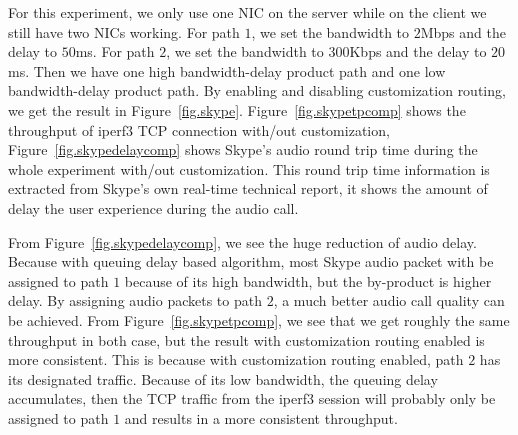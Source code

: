 For this experiment, we only use one NIC on the server while on the client we still have two NICs working. For path $1$, we set the bandwidth to $2$Mbps and the delay to $50$ms. For path $2$, we set the bandwidth to $300$Kbps and the delay to $20$ms. Then we have one high bandwidth-delay product path and one low bandwidth-delay product path. By enabling and disabling customization routing, we get the result in Figure~\ref{fig.skype}. Figure~\ref{fig.skypetpcomp} shows the throughput of iperf3 TCP connection with/out customization, Figure~\ref{fig.skypedelaycomp} shows Skype's audio round trip time during the whole experiment with/out customization. This round trip time information is extracted from Skype's own real-time technical report, it shows the amount of delay the user experience during the audio call. 

From Figure~\ref{fig.skypedelaycomp}, we see the huge reduction of audio delay. Because with queuing delay based algorithm, most Skype audio packet with be assigned to path $1$ because of its high bandwidth, but the by-product is higher delay. By assigning audio packets to path $2$, a much better audio call quality can be achieved. From Figure~\ref{fig.skypetpcomp}, we see that we get roughly the same throughput in both case, but the result with customization routing enabled is more consistent. This is because with customization routing enabled, path $2$ has its designated traffic. Because of its low bandwidth, the queuing delay accumulates, then the TCP traffic from the iperf3 session will probably only be assigned to path $1$ and results in a more consistent throughput.

